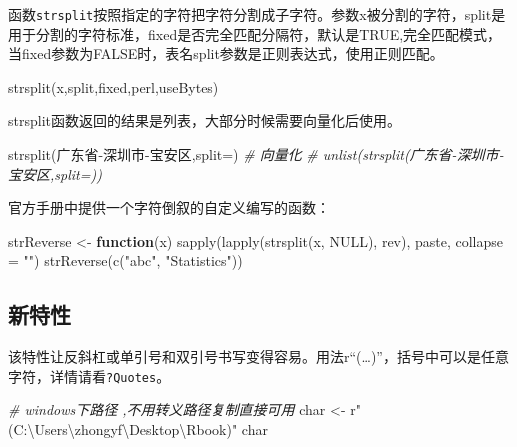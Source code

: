 \documentclass[
]{book}
\newenvironment{Shaded}{\begin{snugshade}}{\end{snugshade}}
\newcommand{\AttributeTok}[1]{\textcolor[rgb]{0.77,0.63,0.00}{#1}}
\newcommand{\CommentTok}[1]{\textcolor[rgb]{0.56,0.35,0.01}{\textit{#1}}}
\newcommand{\ConstantTok}[1]{\textcolor[rgb]{0.00,0.00,0.00}{#1}}
\newcommand{\ControlFlowTok}[1]{\textcolor[rgb]{0.13,0.29,0.53}{\textbf{#1}}}
\newcommand{\FunctionTok}[1]{\textcolor[rgb]{0.00,0.00,0.00}{#1}}
\newcommand{\NormalTok}[1]{#1}
\newcommand{\OtherTok}[1]{\textcolor[rgb]{0.56,0.35,0.01}{#1}}
\newcommand{\StringTok}[1]{\textcolor[rgb]{0.31,0.60,0.02}{#1}}
\begin{document}
函数\texttt{strsplit}按照指定的字符把字符分割成子字符。参数x被分割的字符，split是用于分割的字符标准，fixed是否完全匹配分隔符，默认是TRUE,完全匹配模式，当fixed参数为FALSE时，表名split参数是正则表达式，使用正则匹配。

\begin{Shaded}
\begin{Highlighting}[]
\FunctionTok{strsplit}\NormalTok{(x,split,fixed,perl,useBytes)}
\end{Highlighting}
\end{Shaded}

strsplit函数返回的结果是列表，大部分时候需要向量化后使用。

\begin{Shaded}
\begin{Highlighting}[]
\FunctionTok{strsplit}\NormalTok{(}\StringTok{\textquotesingle{}广东省{-}深圳市{-}宝安区\textquotesingle{}}\NormalTok{,}\AttributeTok{split=}\StringTok{\textquotesingle{}{-}\textquotesingle{}}\NormalTok{)}
\CommentTok{\# 向量化}
\CommentTok{\# unlist(strsplit(\textquotesingle{}广东省{-}深圳市{-}宝安区\textquotesingle{},split=\textquotesingle{}{-}\textquotesingle{}))}
\end{Highlighting}
\end{Shaded}

官方手册中提供一个字符倒叙的自定义编写的函数：

\begin{Shaded}
\begin{Highlighting}[]
\NormalTok{strReverse }\OtherTok{\textless{}{-}} \ControlFlowTok{function}\NormalTok{(x) }\FunctionTok{sapply}\NormalTok{(}\FunctionTok{lapply}\NormalTok{(}\FunctionTok{strsplit}\NormalTok{(x, }\ConstantTok{NULL}\NormalTok{), rev), paste, }\AttributeTok{collapse =} \StringTok{""}\NormalTok{)}
\FunctionTok{strReverse}\NormalTok{(}\FunctionTok{c}\NormalTok{(}\StringTok{"abc"}\NormalTok{, }\StringTok{"Statistics"}\NormalTok{))}
\end{Highlighting}
\end{Shaded}

\hypertarget{newfeatures}{%
\subsection{新特性}\label{newfeatures}}

该特性让反斜杠或单引号和双引号书写变得容易。用法r``(\ldots)''，括号中可以是任意字符，详情请看\texttt{?Quotes}。

\begin{Shaded}
\begin{Highlighting}[]
\CommentTok{\# windows下路径 ,不用转义路径复制直接可用}
\NormalTok{char }\OtherTok{\textless{}{-}}\NormalTok{ r}\StringTok{"(C:\textbackslash{}Users\textbackslash{}zhongyf\textbackslash{}Desktop\textbackslash{}Rbook)"} 
\NormalTok{char}
\end{Highlighting}
\end{Shaded}
\end{document}
